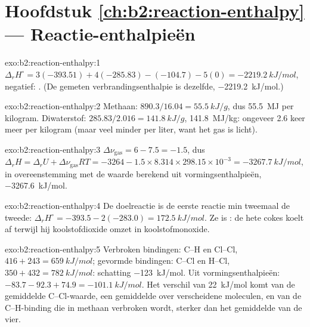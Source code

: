 \section*{Hoofdstuk \ref{ch:b2:reaction-enthalpy} --- Reactie-enthalpieën}

\begin{solution}{exo:b2:reaction-enthalpy:1}
$\Delta_r H^\circ = 3(-393.51) + 4(-285.83) - (-104.7) - 5(0) =
\qty{-2219.2}{kJ/mol}$, negatief: . (De gemeten verbrandingsenthalpie
is dezelfde, \qty{-2219.2}{kJ/mol}.)
\end{solution}

\begin{solution}{exo:b2:reaction-enthalpy:2}
Methaan: $890.3/16.04 = \qty{55.5}{kJ/g}$, dus \qty{55.5}{MJ} per
kilogram. Diwaterstof: $285.83/2.016 = \qty{141.8}{kJ/g}$,
\qty{141.8}{MJ/kg}: ongeveer 2.6 keer meer per kilogram (maar veel minder per
liter, want het gas is licht).
\end{solution}

\begin{solution}{exo:b2:reaction-enthalpy:3}
$\Delta\nu_{\text{gas}} = 6 - 7.5 = -1.5$, dus $\Delta_r H = \Delta_r U +
\Delta\nu_{\text{gas}}RT = -3264 - 1.5 \times 8.314 \times 298.15 \times
10^{-3} = \qty{-3267.7}{kJ/mol}$, in overeenstemming met de waarde berekend uit
vormingsenthalpieën, \qty{-3267.6}{kJ/mol}.
\end{solution}

\begin{solution}{exo:b2:reaction-enthalpy:4}
De doelreactie is de eerste reactie min tweemaal de tweede:
$\Delta_r H^\circ = -393.5 - 2(-283.0) = \qty{+172.5}{kJ/mol}$. Ze is
: de hete cokes koelt af terwijl hij koolstofdioxide omzet in
koolstofmonoxide.
\end{solution}

\begin{solution}{exo:b2:reaction-enthalpy:5}
Verbroken bindingen: C--H en Cl--Cl, $416 + 243 = \qty{659}{kJ/mol}$; gevormde
bindingen: C--Cl en H--Cl, $350 + 432 = \qty{782}{kJ/mol}$: schatting
\qty{-123}{kJ/mol}. Uit vormingsenthalpieën: $-83.7 - 92.3 + 74.9 =
\qty{-101.1}{kJ/mol}$. Het verschil van \qty{22}{kJ/mol} komt van de gemiddelde
C--Cl-waarde, een gemiddelde over verscheidene moleculen, en van de C--H-binding die in
methaan verbroken wordt, sterker dan het gemiddelde van de vier.
\end{solution}

